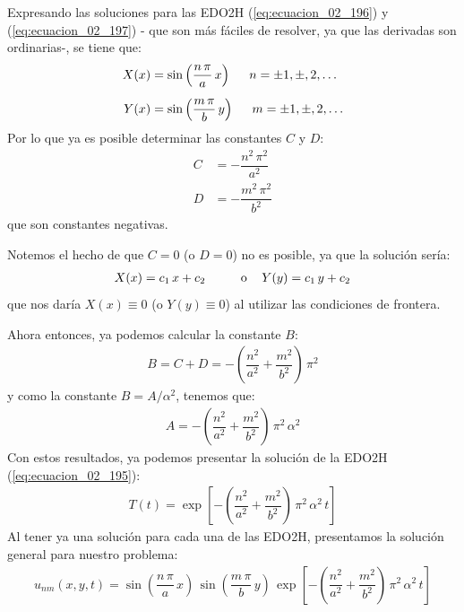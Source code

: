Expresando las soluciones para las EDO2H (\ref{eq:ecuacion_02_196}) y (\ref{eq:ecuacion_02_197}) - que son más fáciles de resolver, ya que las derivadas son ordinarias-, se tiene que:
\begin{align}
X(x) &= \sin \left( \dfrac{n \, \pi}{a} \, x \right) \hspace{0.5cm} n = \pm 1, \pm, 2, \ldots \label{eq:ecuacion_02_202} \\[0.5em]
Y(x) &= \sin \left( \dfrac{m \, \pi}{b} \, y \right) \hspace{0.5cm} m = \pm 1, \pm, 2, \ldots \label{eq:ecuacion_02_203}
\end{align}
Por lo que ya es posible determinar las constantes $C$ y $D$:
\begin{align*}
C &= - \dfrac{n^{2} \, \pi^{2}}{a^{2}} \\[0.5em]
D &= - \dfrac{m^{2} \, \pi^{2}}{b^{2}}
\end{align*}
que son constantes negativas.
\par
Notemos el hecho de que $C = 0$ (o $D = 0$) no es posible, ya que la solución sería:
\begin{align*}
X(x) = c_{1} \, x + c_{2} \hspace{1cm} \mbox{o } \hspace{0.3cm} Y(y) = c_{1} \, y + c_{2}
\end{align*}
que nos daría $X(x) \equiv 0$ (o $Y(y) \equiv 0$) al utilizar las condiciones de frontera.
\par
Ahora entonces, ya podemos calcular la constante $B$:
\begin{align*}
B = C + D = - \left( \dfrac{n^{2}}{a^{2}} + \dfrac{m^{2}}{b^{2}} \right) \, \pi^{2}
\end{align*}
y como la constante $B = A / \alpha^{2}$, tenemos que:
\begin{align}
A = - \left( \dfrac{n^{2}}{a^{2}} + \dfrac{m^{2}}{b^{2}} \right) \, \pi^{2} \, \alpha^{2}
\label{eq:ecuacion_02_204}
\end{align}
Con estos resultados, ya podemos presentar la solución de la EDO2H (\ref{eq:ecuacion_02_195}):
\begin{align}
T(t) = \exp\left[ - \left( \dfrac{n^{2}}{a^{2}} + \dfrac{m^{2}}{b^{2}} \right) \, \pi^{2} \, \alpha^{2} \, t \right]
\label{eq:ecuacion_02_205}
\end{align}
Al tener ya una solución para cada una de las EDO2H, presentamos la solución general para nuestro problema:
\begin{align}
u_{nm}(x, y, t) = \sin \left( \dfrac{n \, \pi}{a} \, x \right) \, \sin \left( \dfrac{m \, \pi}{b} \, y \right) \, \exp\left[ - \left( \dfrac{n^{2}}{a^{2}} + \dfrac{m^{2}}{b^{2}} \right) \, \pi^{2} \, \alpha^{2} \, t \right]
\label{eq:ecuacion_02_206}
\end{align}
